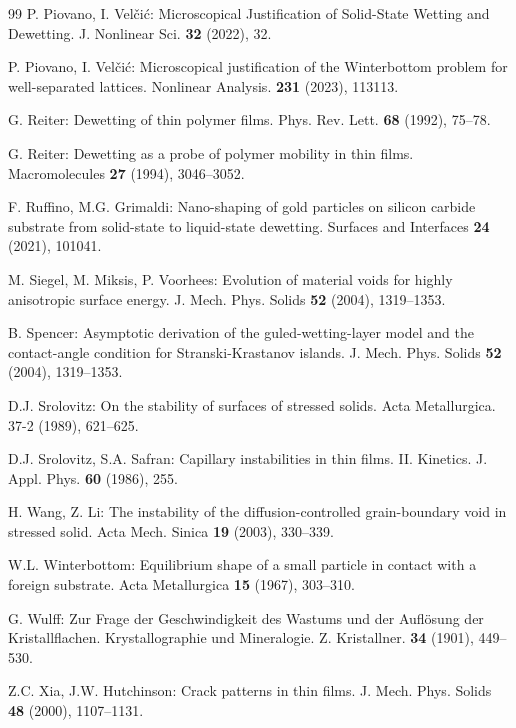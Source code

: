 \documentclass[reqno]{amsart}
\numberwithin{equation}{section}
\theoremstyle{plain}
\theoremstyle{definition}
\begin{document}
\begin{thebibliography}{99}
 P. Piovano, I. Vel\v{c}i\'c: Microscopical Justification of Solid-State Wetting and Dewetting. J. Nonlinear Sci. \textbf{32} (2022), 32.


 P. Piovano, I. Vel\v{c}i\'c: Microscopical justification of the Winterbottom problem for well-separated lattices. Nonlinear Analysis. \textbf{231} (2023), 113113.

 G. Reiter: Dewetting of thin polymer films. Phys. Rev. Lett. {\bf68} (1992), 75--78.

 G. Reiter: Dewetting as a probe of polymer mobility in thin films. Macromolecules {\bf27} (1994), 3046--3052.


 F. Ruffino, M.G. Grimaldi: Nano-shaping of gold particles on silicon carbide substrate from solid-state to liquid-state dewetting. Surfaces and Interfaces {\bf24}
(2021), 101041.

 M. Siegel, M. Miksis,  P. Voorhees:  Evolution of material voids for highly anisotropic surface energy. J. Mech. Phys. Solids \textbf{52} (2004), 1319--1353.

  B. Spencer:  Asymptotic derivation of the guled-wetting-layer model and the contact-angle condition for Stranski-Krastanov islands. J. Mech. Phys. Solids {\bf 52} (2004), 1319--1353.

 D.J. Srolovitz: On the stability of surfaces of stressed solids. Acta Metallurgica. {37-2} (1989), 621--625.

 D.J. Srolovitz, S.A. Safran: Capillary instabilities in thin films. II. Kinetics. J. Appl. Phys. {\bf60} (1986), 255.


 H. Wang,  Z. Li:  The instability of the diffusion-controlled grain-boundary void in stressed solid. Acta Mech. Sinica  \textbf{19} (2003),  330--339.	

   W.L. Winterbottom: Equilibrium shape of a small particle in contact with a foreign substrate. Acta Metallurgica \textbf{15} (1967), 303--310.

 G. Wulff: Zur Frage der Geschwindigkeit des Wastums und der Aufl\"osung der Kristallflachen. Krystallographie und Mineralogie. Z. Kristallner. \textbf{34} (1901), 449--530.
	
 Z.C. Xia,  J.W. Hutchinson: Crack patterns in thin films. J.  Mech. Phys. Solids \textbf{48} (2000), 1107--1131. 


\end{thebibliography} 
\end{document}
